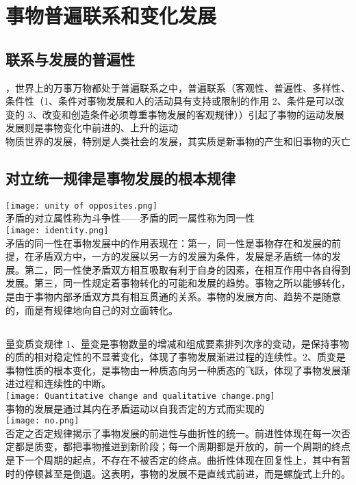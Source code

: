 \documentclass{article}
\begin{document}
	\section{\kaishu 事物普遍联系和变化发展}
		\subsection{\kaishu 联系与发展的普遍性}
			{，世界上的万事万物都处于普遍联系之中，普遍联系（客观性、普遍性、多样性、条件性（1、条件对事物发展和人的活动具有支持或限制的作用 2、条件是可以改变的 3、改变和创造条件必须尊重事物发展的客观规律））引起了事物的运动发展}\\
			{\kaishu 发展则是事物变化中前进的、上升的运动}\\
			{\kaishu 物质世界的发展，特别是人类社会的发展，其实质是新事物的产生和旧事物的灭亡}
		\subsection{\kaishu 对立统一规律是事物发展的根本规律}
			\texttt{[image: unity of opposites.png]}\\
			{\kaishu 矛盾的对立属性称为斗争性——矛盾的同一属性称为同一性}\\
			\texttt{[image: identity.png]}\\
			{\kaishu 矛盾的同一性在事物发展中的作用表现在：第一，同一性是事物存在和发展的前提，在矛盾双方中，一方的发展以另一方的发展为条件，发展是矛盾统一体的发展。第二，同一性使矛盾双方相互吸取有利于自身的因素，在相互作用中各自得到发展。第三，同一性规定着事物转化的可能和发展的趋势。事物之所以能够转化，是由于事物内部矛盾双方具有相互贯通的关系。事物的发展方向、趋势不是随意的，而是有规律地向自己的对立面转化。}
		\subsection{}
			{\kaishu 量变质变规律 1、量变是事物数量的增减和组成要素排列次序的变动，是保持事物的质的相对稳定性的不显著变化，体现了事物发展渐进过程的连续性。2、质变是事物性质的根本变化，是事物由一种质态向另一种质态的飞跃，体现了事物发展渐进过程和连续性的中断。}\\
			\texttt{[image: Quantitative change and qualitative change.png]}\\
			{\kaishu 事物的发展是通过其内在矛盾运动以自我否定的方式而实现的}\\
			\texttt{[image: no.png]}\\
			{\kaishu 否定之否定规律揭示了事物发展的前进性与曲折性的统一。前进性体现在每一次否定都是质变，都把事物推进到新阶段；每一个周期都是开放的，前一个周期的终点是下一个周期的起点，不存在不被否定的终点。曲折性体现在回复性上，其中有暂时的停顿甚至是倒退。这表明，事物的发展不是直线式前进，而是螺旋式上升的。}\\
\end{document}
